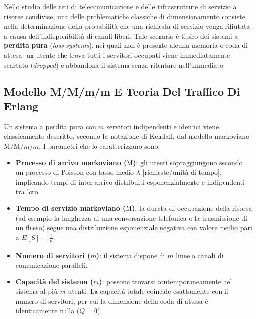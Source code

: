 \documentclass[11pt, a4paper]{article}
\begin{document}
Nello studio delle reti di telecomunicazione e delle infrastrutture di servizio a risorse condivise, una delle problematiche classiche di dimensionamento consiste nella determinazione della probabilità che una richiesta di servizio venga rifiutata a causa dell'indisponibilità di canali liberi. Tale scenario è tipico dei sistemi a \textbf{perdita pura} (\emph{loss systems}), nei quali non è presente alcuna memoria o coda di attesa: un utente che trova tutti i servitori occupati viene immediatamente scartato (\emph{dropped}) e abbandona il sistema senza ritentare nell'immediato.


\subsection{Modello M/M/m/m E Teoria Del Traffico Di Erlang}

Un sistema a perdita pura con $m$ servitori indipendenti e identici viene classicamente descritto, secondo la notazione di Kendall, dal modello markoviano $\text{M/M/}m/m$. I parametri che lo caratterizzano sono:
\begin{itemize}[noitemsep]
    \item \textbf{Processo di arrivo markoviano ($\text{M}$)}: gli utenti sopraggiungono secondo un processo di Poisson con tasso medio $\lambda$ [richieste/unità di tempo], implicando tempi di inter-arrivo distribuiti esponenzialmente e indipendenti tra loro.
    \item \textbf{Tempo di servizio markoviano ($\text{M}$)}: la durata di occupazione della risorsa (ad esempio la lunghezza di una conversazione telefonica o la trasmissione di un flusso) segue una distribuzione esponenziale negativa con valore medio pari a $E[S] = \frac{1}{\mu}$.
    \item \textbf{Numero di servitori ($m$)}: il sistema dispone di $m$ linee o canali di comunicazione paralleli.
    \item \textbf{Capacità del sistema ($m$)}: possono trovarsi contemporaneamente nel sistema al più $m$ utenti. La capacità totale coincide esattamente con il numero di servitori, per cui la dimensione della coda di attesa è identicamente nulla ($Q = 0$).
\end{itemize}
\end{document}
